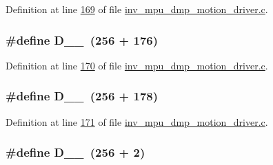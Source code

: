 Definition at line \hyperlink{inv__mpu__dmp__motion__driver_8c_source_l00169}{169} of file \hyperlink{inv__mpu__dmp__motion__driver_8c_source}{inv\+\_\+mpu\+\_\+dmp\+\_\+motion\+\_\+driver.\+c}.

\subsubsection[{\texorpdfstring{D\+\_\+1\+\_\+176}{D_1_176}}]{\setlength{\rightskip}{0pt plus 5cm}\#define D\+\_\+\_~(256 + 176)}\hypertarget{group___d_r_i_v_e_r_s_gab7a349f836821460da79b4bbcb1089c2}{}\label{group___d_r_i_v_e_r_s_gab7a349f836821460da79b4bbcb1089c2}


Definition at line \hyperlink{inv__mpu__dmp__motion__driver_8c_source_l00170}{170} of file \hyperlink{inv__mpu__dmp__motion__driver_8c_source}{inv\+\_\+mpu\+\_\+dmp\+\_\+motion\+\_\+driver.\+c}.

\subsubsection[{\texorpdfstring{D\+\_\+1\+\_\+178}{D_1_178}}]{\setlength{\rightskip}{0pt plus 5cm}\#define D\+\_\+\_~(256 + 178)}\hypertarget{group___d_r_i_v_e_r_s_ga783f9fddb57c3462c7d4344c46cbec51}{}\label{group___d_r_i_v_e_r_s_ga783f9fddb57c3462c7d4344c46cbec51}


Definition at line \hyperlink{inv__mpu__dmp__motion__driver_8c_source_l00171}{171} of file \hyperlink{inv__mpu__dmp__motion__driver_8c_source}{inv\+\_\+mpu\+\_\+dmp\+\_\+motion\+\_\+driver.\+c}.

\subsubsection[{\texorpdfstring{D\+\_\+1\+\_\+2}{D_1_2}}]{\setlength{\rightskip}{0pt plus 5cm}\#define D\+\_\+\_~(256 + 2)}\hypertarget{group___d_r_i_v_e_r_s_gab444dc9d9eaf98f46563cc87fcb965a4}{}\label{group___d_r_i_v_e_r_s_gab444dc9d9eaf98f46563cc87fcb965a4}


